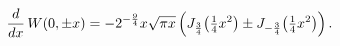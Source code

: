 \[\frac{d}{dx}\mathop{W\/}\nolimits\!\left(0,\pm x\right)=-2^{-\frac{9}{4}}x%
\sqrt{\pi x}\left(\mathop{J_{\frac{3}{4}}\/}\nolimits\!\left(\tfrac{1}{4}x^{2}%
\right)\pm\mathop{J_{-\frac{3}{4}}\/}\nolimits\!\left(\tfrac{1}{4}x^{2}\right)%
\right).\]